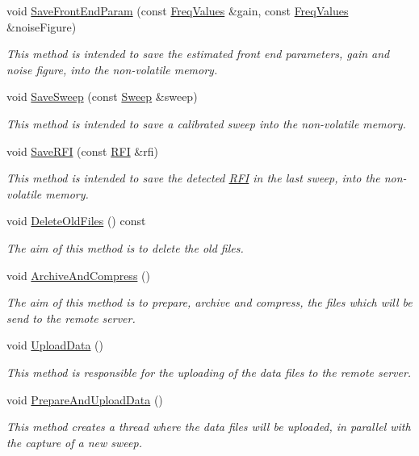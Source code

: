 \begin{DoxyCompactItemize}
void \hyperlink{classDataLogger_a058ed66d04269e7d37501ecfe775c067}{Save\+Front\+End\+Param} (const \hyperlink{structFreqValues}{Freq\+Values} \&gain, const \hyperlink{structFreqValues}{Freq\+Values} \&noise\+Figure)
\begin{DoxyCompactList}\small\item\em This method is intended to save the estimated front end parameters, gain and noise figure, into the non-\/volatile memory. \end{DoxyCompactList}\item 
void \hyperlink{classDataLogger_ab2063fcd87971520a5bfa5aef6d73fea}{Save\+Sweep} (const \hyperlink{structSweep}{Sweep} \&sweep)
\begin{DoxyCompactList}\small\item\em This method is intended to save a calibrated sweep into the non-\/volatile memory. \end{DoxyCompactList}\item 
void \hyperlink{classDataLogger_a0c772c3529adc3759ba0e1e596500f65}{Save\+R\+FI} (const \hyperlink{structRFI}{R\+FI} \&rfi)
\begin{DoxyCompactList}\small\item\em This method is intended to save the detected \hyperlink{structRFI}{R\+FI} in the last sweep, into the non-\/volatile memory. \end{DoxyCompactList}\item 
\mbox{\label{classDataLogger_a4fd6e432dd4348cbe3b02a0fd6969ab5}} 
void \hyperlink{classDataLogger_a4fd6e432dd4348cbe3b02a0fd6969ab5}{Delete\+Old\+Files} () const
\begin{DoxyCompactList}\small\item\em The aim of this method is to delete the old files. \end{DoxyCompactList}\item 
void \hyperlink{classDataLogger_a147fb7eaee1c38bbf57ef2d6cddf70d5}{Archive\+And\+Compress} ()
\begin{DoxyCompactList}\small\item\em The aim of this method is to prepare, archive and compress, the files which will be send to the remote server. \end{DoxyCompactList}\item 
void \hyperlink{classDataLogger_ab58f4cc05f738ef757c884fe9ef131eb}{Upload\+Data} ()
\begin{DoxyCompactList}\small\item\em This method is responsible for the uploading of the data files to the remote server. \end{DoxyCompactList}\item 
void \hyperlink{classDataLogger_a98ea7aaa941bbddea8069415e1652759}{Prepare\+And\+Upload\+Data} ()
\begin{DoxyCompactList}\small\item\em This method creates a thread where the data files will be uploaded, in parallel with the capture of a new sweep. \end{DoxyCompactList}\end{DoxyCompactItemize}
